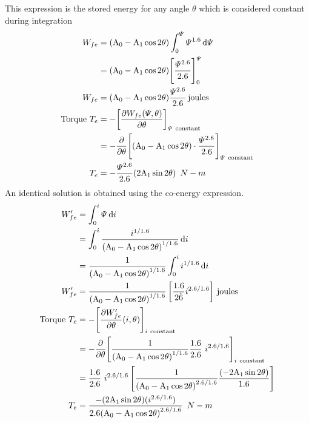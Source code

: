 \documentclass[a4paper,numbers=noenddot,12pt]{scrbook}
\begin{document}
            This expression is the stored energy for any angle $\theta$ which is considered constant during integration
            \begin{align}
                W_{fe} & = (\textup{A}_0 - \textup{A}_1 \cos 2\theta) \int_0^{\varPsi} \varPsi^{1.6} \dif \varPsi \nonumber \\
                & = (\textup{A}_0 - \textup{A}_1 \cos 2\theta) {\left[ \dfrac{\varPsi^{2.6}}{2.6}\right]}_0^{\varPsi} \nonumber \\
                W_{fe} & = (\textup{A}_0 - \textup{A}_1 \cos 2\theta) \dfrac{\varPsi^{2.6}}{2.6} \,\text{joules} \\
                \text{Torque } T_e & = -{\left[\dfrac{\partial W_{fe}(\varPsi, \theta)}{\partial \theta} \right]}_{\varPsi \ \text{constant}} \nonumber \\
                & = - \dfrac{\partial}{\partial \theta} {\left[(\textup{A}_0 - \textup{A}_1 \cos 2 \theta) \cdot \dfrac{\varPsi^{2.6}}{2.6} \right]}_{\varPsi \ \text{constant}} \nonumber \\
                T_e & = - \dfrac{\varPsi^{2.6}}{2.6} (2 \textup{A}_1 \sin 2 \theta)\enspace N - m
                \label{eq:Eq3.34}
            \end{align}
            An identical solution is obtained using the co-energy expression.
            \begin{align}
                W_{fe}' & = \int_0^{i} \varPsi \dif i \nonumber \\
                & = \int_{0}^{i} \dfrac{i^{1 / 1.6}}{{(\textup{A}_0 - \textup{A}_1 \cos 2\theta)}^{1/1.6}} \dif i \nonumber \\
                & = \dfrac{1}{{(\textup{A}_0 - \textup{A}_1 \cos 2\theta)}^{1/1.6}} \int_0^i i^{1/1.6} \dif i \nonumber \\
                W_{fe}' & =\dfrac{1}{{(\textup{A}_0 - \textup{A}_1 \cos 2\theta)}^{1/1.6}} \left[\dfrac{1.6}{2 \dot 6} i^{2.6/1.6} \right] \, \text{joules} \\
                \text{Torque } T_e & = -{\left[\dfrac{\partial W_{fe}'}{\partial \theta}(i,\theta) \right]}_{i \ \text{constant}} \nonumber \\
                & = - \dfrac{\partial}{\partial \theta} {\left[ \dfrac{1}{{(\textup{A}_0 - \textup{A}_1 \cos 2 \theta)}^{1 / 1.6}} \dfrac{1.6}{2.6} \ i^{2.6 / 1.6} \right]}_{i \ \text{constant}} \nonumber \\
                & =\dfrac{1.6}{2.6} \ i^{2.6 / 1.6} \left[ \dfrac{1}{{(\textup{A}_0 - \textup{A}_1 \cos 2 \theta)}^{2.6 / 1.6}} \dfrac{(-2 \textup{A}_1 \sin 2 \theta)}{1.6} \right] \nonumber \\
                T_e & = \dfrac{-(2 \textup{A}_1 \sin 2 \theta)(i^{2.6 / 1.6})}{2.6 {(\textup{A}_0 - \textup{A}_1 \cos 2 \theta)}^{2.6 /1.6}}\enspace N - m
                \label{eq:Eq3.36}
            \end{align}
\end{document}
